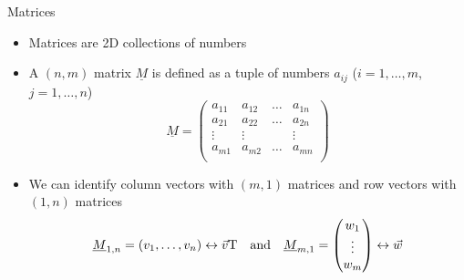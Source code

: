   \begin{frame}{Matrices}
    \begin{itemize}
      \item Matrices are 2D collections of numbers
      \item A $(n, m)$ matrix $\underline{M}$ is defined as a tuple of numbers
        $a_{ij}$ ($i=1,\dots,m$, $j=1,\dots,n$)
        \begin{equation*}
          \underline{M} =
          \begin{pmatrix}
            a_{11} & a_{12} & \dots & a_{1n} \\
            a_{21} & a_{22} & \dots & a_{2n} \\
            \vdots & \vdots & & \vdots \\
            a_{m1} & a_{m2} & \dots & a_{mn} \\
          \end{pmatrix}
        \end{equation*}
      \item We can identify column vectors with $(m, 1)$ matrices and row
        vectors with $(1, n)$ matrices
        \begin{equation*}
          \underline{M}_{1,n} = \left(v_1, \dots, v_n\right)
            \leftrightarrow \vec{v}\text{T} \quad\text{and}\quad
          \underline{M}_{m, 1} =
            \begin{pmatrix}w_1 \\ \vdots \\ w_m \end{pmatrix}
            \leftrightarrow \vec{w}
        \end{equation*}
    \end{itemize}
  \end{frame}

